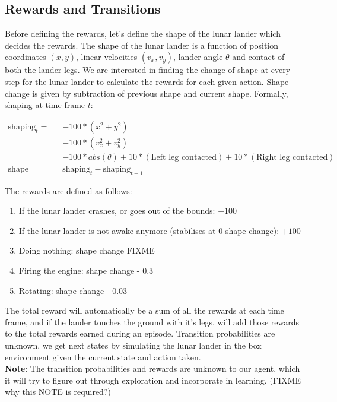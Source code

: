 \subsection{Rewards and Transitions}

Before defining the rewards, let's define the shape of the lunar lander which decides the rewards. The shape of the lunar lander is a function of position coordinates $(x, y)$, linear velocities $(v_x, v_y)$, lander angle $\theta$ and contact of both the lander legs. We are interested in finding the change of shape at every step for the lunar lander to calculate the rewards for each given action. Shape change is given by subtraction of previous shape and current shape. Formally, shaping at time frame $t$:

\begin{align*}
\text{shaping}_{t} = &- 100*(x^2 + y^2) \\
           & - 100*(v_x^2 + v_y^2) \\
            &- 100*abs(\theta) + 10*(\text{Left leg contacted}) + 10*(\text{Right leg contacted}) \\
\text{shape change} = & \text{shaping}_t - \text{shaping}_{t-1}
\end{align*}

The rewards are defined as follows:

\begin{enumerate}
\item If the lunar lander crashes, or goes out of the bounds: $-100$
\item If the lunar lander is not awake anymore (stabilises at 0 shape change): $+100$
\item Doing nothing: shape change FIXME
\item Firing the engine: shape change - 0.3
\item Rotating: shape change - 0.03
\end{enumerate}

The total reward will automatically be a sum of all the rewards at each time frame, and if the lander touches the ground with it's legs, will add those rewards to the total rewards earned during an episode. Transition probabilities are unknown, we get next states by simulating the lunar lander in the box environment given the current state and action taken. \\

\textbf{Note}: The transition probabilities and rewards are unknown to our agent, which it will try to figure out through exploration and incorporate in learning. (FIXME why this NOTE is required?)